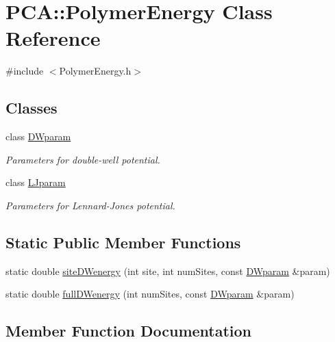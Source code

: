 \hypertarget{class_p_c_a_1_1_polymer_energy}{}\section{P\+CA\+:\+:Polymer\+Energy Class Reference}
\label{class_p_c_a_1_1_polymer_energy}


{\ttfamily \#include $<$Polymer\+Energy.\+h$>$}

\subsection*{Classes}
\begin{DoxyCompactItemize}
\item 
class \hyperlink{class_p_c_a_1_1_polymer_energy_1_1_d_wparam}{D\+Wparam}
\begin{DoxyCompactList}\small\item\em Parameters for double-\/well potential. \end{DoxyCompactList}\item 
class \hyperlink{class_p_c_a_1_1_polymer_energy_1_1_l_jparam}{L\+Jparam}
\begin{DoxyCompactList}\small\item\em Parameters for Lennard-\/\+Jones potential. \end{DoxyCompactList}\end{DoxyCompactItemize}
\subsection*{Static Public Member Functions}
\begin{DoxyCompactItemize}
\item 
static double \hyperlink{class_p_c_a_1_1_polymer_energy_a835b345f0e6151a18962e4fb06a922bf}{site\+D\+Wenergy} (int site, int num\+Sites, const \hyperlink{class_p_c_a_1_1_polymer_energy_1_1_d_wparam}{D\+Wparam} \&param)
\item 
static double \hyperlink{class_p_c_a_1_1_polymer_energy_af55384a44f3e1aa5f32788b179d1cfe8}{full\+D\+Wenergy} (int num\+Sites, const \hyperlink{class_p_c_a_1_1_polymer_energy_1_1_d_wparam}{D\+Wparam} \&param)
\end{DoxyCompactItemize}


\subsection{Member Function Documentation}
\hypertarget{class_p_c_a_1_1_polymer_energy_af55384a44f3e1aa5f32788b179d1cfe8}{}\label{class_p_c_a_1_1_polymer_energy_af55384a44f3e1aa5f32788b179d1cfe8} 
